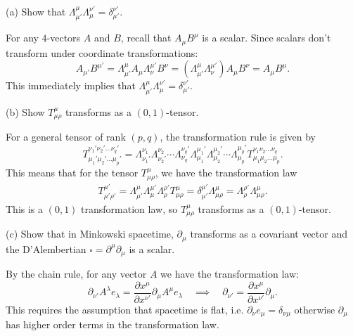 \documentclass{../../templates/lkx_pset}
\begin{document}
\begin{problem}{3}
\end{problem}
\begin{parts}
	\begin{part}{(a)}
		Show that $\Lambda^\mu_{\mu'}\Lambda^{\nu'}_{\mu} = \delta_{\mu'}^{\nu'}$.
	\end{part}

	For any $4$-vectors $A$ and $B$, recall that $A_\mu B^\mu$ is a scalar. Since scalars don't transform under coordinate transformations:
	\[
    A_{\mu'}B^{\mu'} = \Lambda^\mu_{\mu'} A_\mu \Lambda_\nu^{\mu'} B^\nu = (\Lambda^\mu_{\mu'}\Lambda^{\mu'}_{\nu}) A_\mu B^\nu = A_{\mu}B^{\mu}.
	\]
	This immediately implies that $\Lambda^\mu_{\mu'}\Lambda^{\nu'}_\mu = \delta^{\nu'}_{\mu'}$.

	\begin{part}{(b)}
		Show $T^\mu_{\mu \rho}$ transforms as a $(0,1)$-tensor.
	\end{part}

	For a general tensor of rank $(p,q)$, the transformation rule is given by
	\[
		T_{\mu_1'\mu_2'\ldots \mu_p'}^{\nu_1'\nu_2'\ldots \nu_q'} =
		\Lambda_{\nu_1'}^{\nu_1}\Lambda_{\nu_2'}^{\nu_2}\cdots \Lambda_{\nu_q}^{\nu_q'}
		\Lambda_{\mu_1}^{\mu_1'}\Lambda_{\mu_2}^{\mu_2'}\cdots \Lambda_{\mu_p}^{\mu_p'} T^{\nu_1\nu_2\ldots \nu_q}_{\mu_1\mu_2\ldots\mu_p}.
	\]
	This means that for the tensor $T^\mu_{\mu\rho}$, we have the transformation law
	\[
		\begin{aligned}
			T_{\mu'\rho'}^{\mu'} = \Lambda^\mu_{\mu'}\Lambda_{\mu}^{\mu'}\Lambda_{\rho}^{\rho'} T_{\mu\rho}^{\mu} = \delta^{\mu'}_{\mu'}\Lambda^{\mu}_{\mu\rho} = \Lambda^{\rho'}_{\rho}\Lambda^{\mu}_{\mu\rho}.
		\end{aligned}
	\]
	This is a $(0,1)$ transformation law, so $T^\mu_{\mu\rho}$ transforms as a $(0,1)$-tensor.

	\begin{part}{(c)}
		Show that in Minkowski spacetime, $\partial_\mu$ transforms as a covariant vector and the D'Alembertian $\square = \partial^\mu\partial_\mu$ is a scalar.
	\end{part}

	By the chain rule, for any vector $A$ we have the transformation law:
	\[
		\partial_{\nu'}A^\lambda e_\lambda = \frac{\partial x^{\mu}}{\partial x^{\nu'}}\partial_{\mu} A^\mu e_\lambda\quad\implies\quad
		\partial_{\nu'} = \frac{\partial x^\mu}{\partial x^{\nu'}}\partial_{\mu}.
	\]
	This requires the assumption that spacetime is flat, i.e. $\partial_{\nu}e_\mu=\delta_{\nu\mu}$ otherwise $\partial_\mu$ has higher order terms in the transformation law.


\end{parts}
\end{document}
